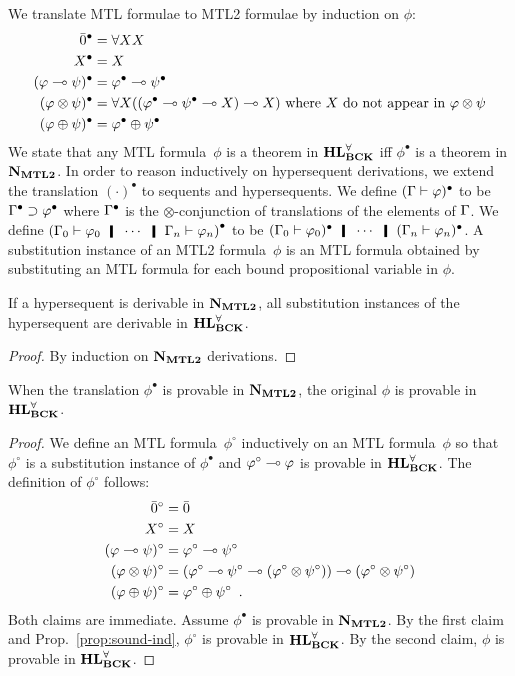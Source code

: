 We translate MTL formulae to MTL2 formulae by
induction on $\phi$:
\begin{align*}
 \bar{0}^\bullet &= \forall XX \nonumber\\
 X^\bullet &= X \nonumber\\
 (\varphi\multimap\psi)^\bullet &= \varphi^\bullet \multimap \psi^\bullet\nonumber\\
 (\varphi\otimes\psi)^\bullet & = \forall
 X((\varphi^\bullet\multimap\psi^\bullet\multimap X)\multimap X) \text{ where }X\text{ do
 not appear in }\varphi\otimes\psi\nonumber\\
 (\varphi\oplus\psi)^\bullet &= \varphi^\bullet \oplus \psi^\bullet
\end{align*}
We state that any MTL formula~$\phi$ is a theorem in $\mathbf{HL}^\forall_{\mathbf{BCK}}$ iff
 $\phi^\bullet$ is a theorem in $\mathbf{N}_{\mathbf{MTL2}}$.
 In order to reason inductively on hypersequent derivations, we extend
 the translation $(\cdot)^\bullet$ to sequents and hypersequents.
 We define $(\Gamma\vdash\varphi)^\bullet$ to be $\Gamma^\bullet\supset\varphi^\bullet$
 where
 $\Gamma^\bullet$ is the $\otimes$-conjunction of translations of the
 elements of $\Gamma$.
 We define
 $\left(\G_0\tr\phi_0\hmid\cdots\hmid\G_n\tr\phi_n\right)^\bullet$ to be
 $(\G_0\tr\phi_0)^\bullet\hmid\cdots \hmid (\G_n\tr\phi_n)^\bullet$.
A substitution instance of an MTL2 formula~$\phi$ is an MTL formula obtained by
substituting an MTL formula for each bound propositional variable in $\phi$.
 \begin{proposition}
  \label{prop:sound-ind}
  If a hypersequent is derivable in $\mathbf{N}_{\mathbf{MTL2}}$, all substitution instances
  of the hypersequent are derivable in $\mathbf{HL}^\forall_{\mathbf{BCK}}$.
 \end{proposition}
  \begin{proof}
   By induction on $\mathbf{N}_{\mathbf{MTL2}}$ derivations.
  \end{proof}

 \begin{proposition}[Soundness]
  \label{prop:sound}
  When the translation $\phi^\bullet$ is provable in $\mathbf{N}_{\mathbf{MTL2}}$, the
  original $\phi$ is provable in $\mathbf{HL}^\forall_{\mathbf{BCK}}$.
 \end{proposition}
  \begin{proof}
   We define an MTL formula~$\phi^\circ$ inductively on an MTL
   formula~$\phi$ so that $\phi^\circ$ is a substitution instance of
   $\phi^\bullet$ and $\varphi^\circ\multimap\varphi$ is provable in
   $\mathbf{HL}^\forall_{\mathbf{BCK}}$.
   The definition of $\phi^\circ$ follows:
   \begin{align*}
    \bar 0^\circ&= \bar 0\\
    X^\circ &=X \\
    (\varphi\multimap\psi)^\circ&=\varphi^\circ\multimap\psi^\circ\\
    (\varphi\otimes\psi)^\circ &=
    (\varphi^\circ\multimap\psi^\circ\multimap(\varphi^\circ\otimes\psi^\circ))\multimap(\varphi^\circ\otimes\psi^\circ)\\
    (\varphi\oplus\psi)^\circ &= \varphi^\circ \oplus \psi^\circ\enspace.
   \end{align*}
   Both claims are immediate.  Assume $\phi^\bullet$
   is provable in $\mathbf{N}_{\mathbf{MTL2}}$.  By the first claim and Prop.~\ref{prop:sound-ind},
   $\phi^\circ$ is provable in $\mathbf{HL}^\forall_{\mathbf{BCK}}$.  By the second claim, $\phi$ is
   provable in $\mathbf{HL}^\forall_{\mathbf{BCK}}$.
  \end{proof}

